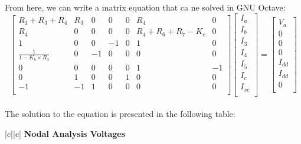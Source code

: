 \paragraph{}
From here, we can write a matrix equation that ca ne solved in GNU Octave:
\[
\begin{bmatrix}
R_1+R_3+R_4 & R_3 & 0 & 0 & 0 & R_4 & 0\\
R_4 & 0 & 0 & 0 & 0 & R_4+R_6+R_7-K_c & 0\\ 
1 & 0 & 0 & -1 & 0 & 1 & 0\\
\frac{1}{1-K_b \times R_3} & 0 & -1 & 0 & 0 & 0 & 0\\
0 & 0 & 0 & 0 & 0 & 1 & -1\\
0 & 1 & 0 & 0 & 1 & 0 & 0\\ 
-1 & -1 & 1 & 0 & 0 & 0 & 0\\ 
\end{bmatrix}
\begin{bmatrix}
I_a\\
I_b\\
I_3\\
I_4\\
I_5\\
I_c\\
I_{vc}\\
\end{bmatrix}
=
\begin{bmatrix}
V_a\\
0\\
0\\
0\\
I_{dd}\\
I_{dd}\\
0\\
\end{bmatrix}
\]

\paragraph{}
The solution to the equation is presented in the following table:

   \begin{tabular}{|c||c|}
      \hline    
       {\bf Nodal Analysis Voltages} \\
      \hline

        
     
      \end{tabular}
 


